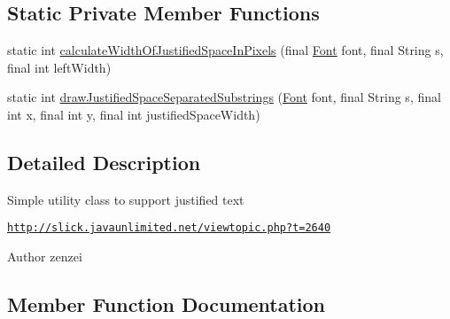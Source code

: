 \subsection*{Static Private Member Functions}
\begin{DoxyCompactItemize}
\item 
static int \mbox{\hyperlink{classorg_1_1newdawn_1_1slick_1_1util_1_1_font_utils_a943341fc5527d304e4d6a14256637ad4}{calculate\+Width\+Of\+Justified\+Space\+In\+Pixels}} (final \mbox{\hyperlink{interfaceorg_1_1newdawn_1_1slick_1_1_font}{Font}} font, final String s, final int left\+Width)
\item 
static int \mbox{\hyperlink{classorg_1_1newdawn_1_1slick_1_1util_1_1_font_utils_a78f38939342f9f8bbc6a8bd3cf1c856d}{draw\+Justified\+Space\+Separated\+Substrings}} (\mbox{\hyperlink{interfaceorg_1_1newdawn_1_1slick_1_1_font}{Font}} font, final String s, final int x, final int y, final int justified\+Space\+Width)
\end{DoxyCompactItemize}


\subsection{Detailed Description}
Simple utility class to support justified text

\href{http://slick.javaunlimited.net/viewtopic.php?t=2640}{\tt http\+://slick.\+javaunlimited.\+net/viewtopic.\+php?t=2640}

\begin{DoxyAuthor}{Author}
zenzei 
\end{DoxyAuthor}


\subsection{Member Function Documentation}
\mbox{\label{classorg_1_1newdawn_1_1slick_1_1util_1_1_font_utils_a943341fc5527d304e4d6a14256637ad4}} 
